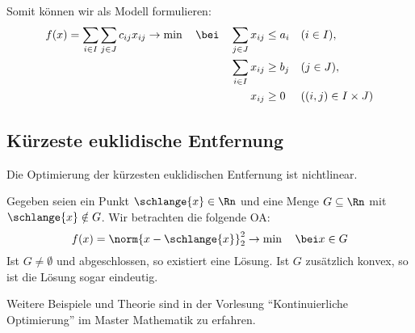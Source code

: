 Somit können wir als Modell formulieren:
\begin{equation*}
	\begin{alignedat}{2}
	f(x) = \sum_{i \in I} \sum_{j \in J} c_{ij} x_{ij} \to \min \quad \bei \quad \sum_{j \in J} x_{ij} &\le a_i &\quad &(i \in I), \\
	\sum_{i \in I} x_{ij} &\ge b_j &\quad & (j \in J), \\
	 x_{ij} &\ge 0 & \quad & ((i,j) \in I \times J)
	\end{alignedat}
\end{equation*}

\subsection{Kürzeste euklidische Entfernung}

Die Optimierung der kürzesten euklidischen Entfernung ist nichtlinear.

Gegeben seien ein Punkt $\schlange{x} \in \Rn$ und eine Menge $G \subseteq \Rn$ mit $\schlange{x} \notin G$. Wir betrachten die folgende OA:
\begin{equation*}
	f(x) = \norm{x - \schlange{x}}_2^2 \to \min \quad \bei x \in G
\end{equation*}
Ist $G \neq \emptyset$ und abgeschlossen, so existiert eine Lösung. Ist $G$ zusätzlich konvex, so ist die Lösung sogar eindeutig.

Weitere Beispiele und Theorie sind in der Vorlesung \enquote{Kontinuierliche Optimierung} im Master Mathematik zu erfahren.